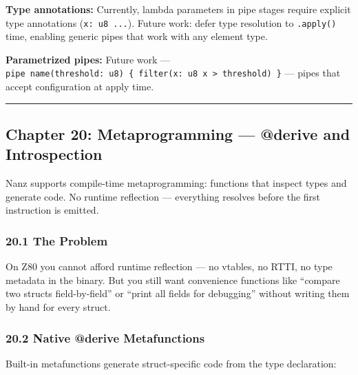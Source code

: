 \documentclass[
  11pt,
]{article}
\begin{document}
\textbf{Type annotations:} Currently, lambda parameters in pipe stages
require explicit type annotations
(\texttt{\textbar{}x:\ u8\textbar{}\ ...}). Future work: defer type
resolution to \texttt{.apply()} time, enabling generic pipes that work
with any element type.

\textbf{Parametrized pipes:} Future work ---
\texttt{pipe\ name(threshold:\ u8)\ \{\ filter(\textbar{}x:\ u8\textbar{}\ x\ \textgreater{}\ threshold)\ \}}
--- pipes that accept configuration at apply time.

\begin{center}\rule{0.5\linewidth}{0.5pt}\end{center}

\hypertarget{chapter-20-metaprogramming-derive-and-introspection}{%
\subsection{Chapter 20: Metaprogramming --- @derive and
Introspection}\label{chapter-20-metaprogramming-derive-and-introspection}}

Nanz supports compile-time metaprogramming: functions that inspect types
and generate code. No runtime reflection --- everything resolves before
the first instruction is emitted.

\hypertarget{the-problem-1}{%
\subsubsection{20.1 The Problem}\label{the-problem-1}}

On Z80 you cannot afford runtime reflection --- no vtables, no RTTI, no
type metadata in the binary. But you still want convenience functions
like ``compare two structs field-by-field'' or ``print all fields for
debugging'' without writing them by hand for every struct.

\hypertarget{native-derive-metafunctions}{%
\subsubsection{20.2 Native @derive
Metafunctions}\label{native-derive-metafunctions}}

Built-in metafunctions generate struct-specific code from the type
declaration:
\end{document}
